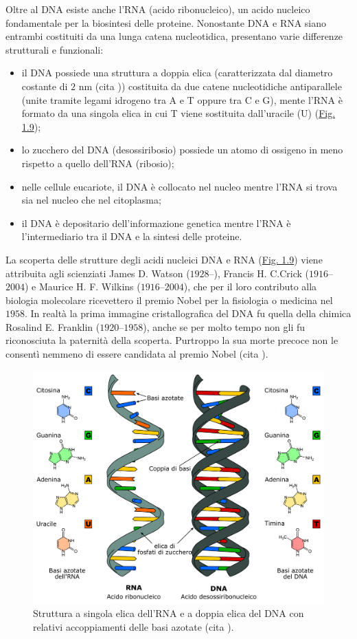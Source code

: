 \documentclass[12pt,a4paper,twoside]{report}
\begin{document}
	Oltre al DNA esiste anche l'RNA (acido ribonucleico), un acido nucleico fondamentale per la biosintesi delle proteine. Nonostante DNA e RNA siano entrambi costituiti da una lunga catena nucleotidica, presentano varie differenze strutturali e funzionali:
	\begin{itemize}
		\item il DNA possiede una struttura a doppia elica (caratterizzata dal diametro costante di $2\mbox{ nm}$ (cita
		)) costituita da due catene nucleotidiche antiparallele (unite tramite legami idrogeno tra A e T oppure tra C e G), mente l'RNA è formato da una singola elica in cui T viene sostituita dall'uracile (U) (\hyperref[fig:dna_structure]{Fig. 1.9});
		\item lo zucchero del DNA (desossiribosio) possiede un atomo di ossigeno in meno rispetto a quello dell'RNA (ribosio);
		\item nelle cellule eucariote, il DNA è collocato nel nucleo mentre l'RNA si trova sia nel nucleo che nel citoplasma;
		\item il DNA è depositario dell'informazione genetica mentre l'RNA è l'intermediario tra il DNA e la sintesi delle proteine.
	\end{itemize}
	La scoperta delle strutture degli acidi nucleici DNA e RNA (\hyperref[fig:dna_structure]{Fig. 1.9}) viene attribuita agli scienziati James D. Watson ($1928$--), Francis H. C.Crick ($1916$--$2004$) e Maurice H. F. Wilkins ($1916$--$2004$), che per il loro contributo alla biologia molecolare ricevettero il premio Nobel per la fisiologia o medicina nel $1958$. In realtà la prima immagine cristallografica del DNA fu quella della chimica Rosalind E. Franklin ($1920$--$1958$), anche se per molto tempo non gli fu riconosciuta la paternità della scoperta. Purtroppo la sua morte precoce non le consentì nemmeno di essere candidata al premio Nobel (cita
	).
	\begin{figure}[H]
		\centering
		\includegraphics[width=0.9\linewidth]{dna_structure.pdf}
		\caption{Struttura a singola elica dell'RNA e a doppia elica del DNA con relativi accoppiamenti delle basi azotate (cita
		).}
		\label{fig:dna_structure}
	\end{figure}
\end{document}
